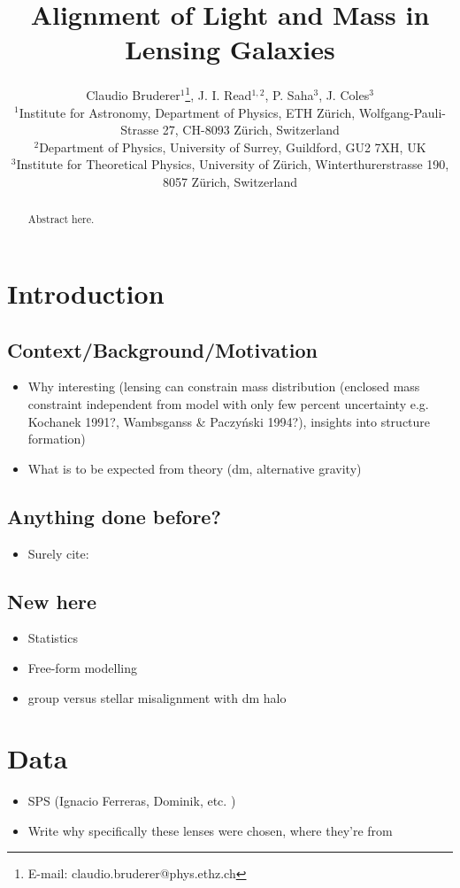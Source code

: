 \documentclass[useAMS,usenatbib]{mn2e}
\title[Alignment of Light and Mass in Lensing Galaxies]{Alignment of Light and Mass in Lensing Galaxies}
\author[Bruderer]{Claudio Bruderer$^1$\thanks{E-mail: claudio.bruderer@phys.ethz.ch}, J. I. Read$^{1,2}$, P. Saha$^3$, J. Coles$^3$\\
$^1$Institute for Astronomy, Department of Physics, ETH Z\"urich, Wolfgang-Pauli-Strasse 27, CH-8093 Z\"urich, Switzerland\\
$^2$Department of Physics, University of Surrey, Guildford, GU2 7XH, UK\\
$^3$Institute for Theoretical Physics, University of Z\"urich, Winterthurerstrasse 190, 8057 Z\"urich, Switzerland
}
\begin{document}
\maketitle

\begin{abstract}
Abstract here. 
\end{abstract}

\begin{keywords}
\end{keywords}

\section{Introduction}

\subsection{Context/Background/Motivation}
\begin{itemize}
\item Why interesting (lensing can constrain mass distribution (enclosed mass constraint independent from model with only few percent uncertainty e.g. Kochanek 1991?, Wambsganss \& Paczyński 1994?), insights into structure formation)
\item What is to be expected from theory (dm, alternative gravity)
\end{itemize}


\subsection{Anything done before?}
\begin{itemize}
\item Surely cite: \cite{1997ApJ...482..604K,1998ApJ...509..561K,2006ApJ...649..599K,2009ApJ...690..670T,2012ApJ...761..170G}
\end{itemize}


\subsection{New here}
\begin{itemize}
\item Statistics
\item Free-form modelling
\item group versus stellar misalignment with dm halo
\end{itemize}



\section{Data}
\begin{itemize}
\item SPS (Ignacio Ferreras, Dominik, etc. \citep{2011ApJ...740...97L})
\item Write why specifically these lenses were chosen, where they're from
\end{itemize}
\end{document}
